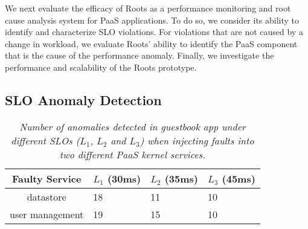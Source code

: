 We next evaluate the efficacy of Roots as a performance monitoring and root cause
analysis system for PaaS applications.
To do so, we consider its ability to identify and characterize SLO violations.
For violations that are not caused by a change in workload, we evaluate Roots' ability to identify
the PaaS component that is the cause of the performance anomaly.
Finally, we investigate the performance and scalability of the Roots
prototype. 


\subsection{SLO Anomaly Detection}

\begin{table}
{\footnotesize
\begin{center}
\begin{tabular}{|c|p{1cm}|p{1cm}|p{1cm}|}
\hline
Faulty Service & $L_1$ (30ms) & $L_2$ (35ms) & $L_3$ (45ms) \\ \hline
datastore & 18 & 11 & 10 \\ \hline
user management & 19 & 15 & 10 \\ \hline
\end{tabular}
\end{center}
}
\vspace{-0.2in}
\caption{\textit{Number of anomalies detected in guestbook app under different SLOs 
($L_1$, $L_2$ and $L_3$) when injecting faults into two different PaaS kernel services.
\label{tab:anomaly_counts}
}}
\vspace{-0.2in}
\end{table}

